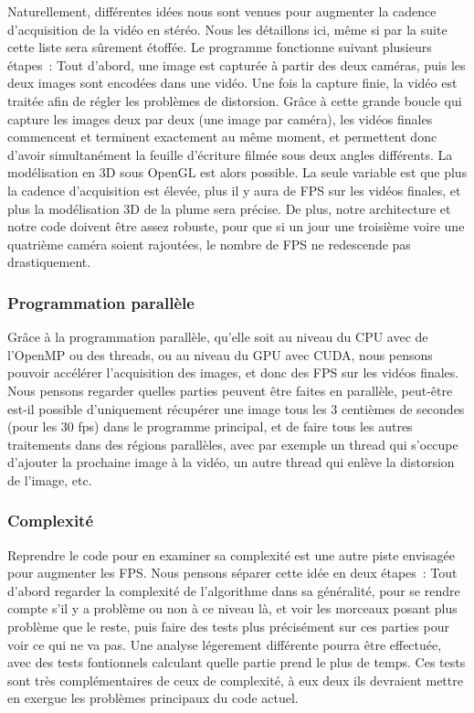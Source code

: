 Naturellement, différentes idées nous sont venues pour augmenter la cadence d'acquisition de la vidéo en stéréo. Nous les détaillons ici, même si par la suite cette liste sera sûrement étoffée. Le programme fonctionne suivant plusieurs étapes~: Tout d'abord, une image est capturée à partir des deux caméras, puis les deux images sont encodées dans une vidéo. Une fois la capture finie, la vidéo est traitée afin de régler les problèmes de distorsion. Grâce à cette grande boucle qui capture les images deux par deux (une image par caméra), les vidéos finales commencent et terminent exactement au même moment, et permettent donc d'avoir simultanément la feuille d'écriture filmée sous deux angles différents. La modélisation en 3D sous OpenGL est alors possible. La seule variable est que plus la cadence d'acquisition est élevée, plus il y aura de FPS sur les vidéos finales, et plus la modélisation 3D de la plume sera précise. De plus, notre architecture et notre code doivent être assez robuste, pour que si un jour une troisième voire une quatrième caméra soient rajoutées, le nombre de FPS ne redescende pas drastiquement.

\subsubsection{Programmation parallèle}

Grâce à la programmation parallèle, qu'elle soit au niveau du CPU avec de l'OpenMP ou des threads, ou au niveau du GPU avec CUDA, nous pensons pouvoir accélérer l'acquisition des images, et donc des FPS sur les vidéos finales. Nous pensons regarder quelles parties peuvent être faites en parallèle, peut-être est-il possible d'uniquement récupérer une image tous les 3 centièmes de secondes (pour les 30 fps) dans le programme principal, et de faire tous les autres traitements dans des régions parallèles, avec par exemple un thread qui s'occupe d'ajouter la prochaine image à la vidéo, un autre thread qui enlève la distorsion de l'image, etc.

\subsubsection{Complexité}

Reprendre le code pour en examiner sa complexité est une autre piste envisagée pour augmenter les FPS. Nous pensons séparer cette idée en deux étapes~: Tout d'abord regarder la complexité de l'algorithme dans sa généralité, pour se rendre compte s'il y a problème ou non à ce niveau là, et voir les morceaux posant plus problème que le reste, puis faire des tests plus précisément sur ces parties pour voir ce qui ne va pas. Une analyse légerement différente pourra être effectuée, avec des tests fontionnels calculant quelle partie prend le plus de temps. Ces tests sont très complémentaires de ceux de complexité, à eux deux ils devraient mettre en exergue les problèmes principaux du code actuel.

